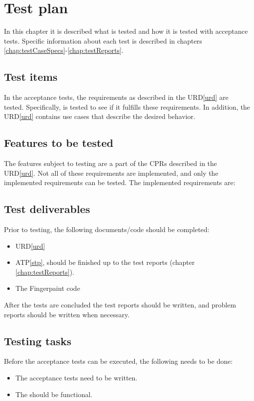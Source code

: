 \chapter{Test plan}
\label{chap:testPlan}
In this chapter it is described what is tested and how it is tested with acceptance tests. Specific information about each test is described in chapters \ref{chap:testCaseSpecs}-\ref{chap:testReports}.

\section{Test items}
In the acceptance tests, the requirements as described in the URD\ref{urd} are tested. Specifically, \applicationname{} is tested to see if it fulfills these requirements. In addition, the URD\ref{urd} contains use cases that describe the desired behavior.

\section{Features to be tested}
The features subject to testing are a part of the CPRs described in the URD\ref{urd}. Not all of these requirements are implemented, and only the implemented requirements can be tested. The implemented requirements are: 

\section{Test deliverables}
Prior to testing, the following documents/code should be completed:
\begin{itemize}
\item URD\ref{urd}
\item ATP\ref{stp}, should be finished up to the test reports (chapter \ref{chap:testReports}).
\item The Fingerpaint code
\end{itemize}
After the tests are concluded the test reports should be written, and problem reports should be written when necessary.

\section{Testing tasks}
Before the acceptance tests can be executed, the following needs to be done:
\begin{itemize}
\item The acceptance tests need to be written.
\item The \applicationname{} should be functional.
\end{itemize}

